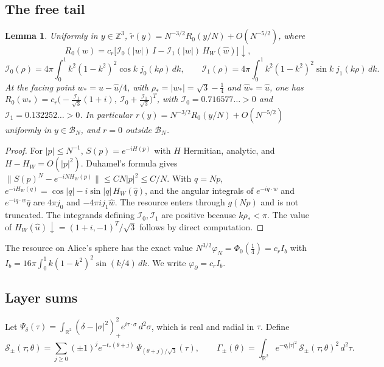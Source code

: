 \documentclass[11pt]{amsart}
\newtheorem{lemma}[theorem]{Lemma}
\theoremstyle{definition}
\theoremstyle{remark}
\newcommand{\Z}{\mathbb{Z}}
\newcommand{\R}{\mathbb{R}}
\newcommand{\cB}{\mathcal{B}}
\newcommand{\cS}{\mathcal{S}}
\newcommand{\dn}{{\downarrow}}
\newcommand{\uhat}{\hat u}
\begin{document}
\subsection{The free tail}
\begin{lemma}\label{lem:tail}
Uniformly in $y\in\Z^3$,
$\widetilde r(y)=N^{-3/2}R_0(y/N)+O(N^{-5/2})$, where
\[
R_0(w)=c_r\bigl[\mathcal I_0(|w|)\,I-\mathcal I_1(|w|)\,H_W(\hat w)\bigr]\dn,
\]
\[
\mathcal I_0(\rho)=4\pi\int_0^1k^2(1-k^2)^2\cos k\;j_0(k\rho)\,dk,\qquad
\mathcal I_1(\rho)=4\pi\int_0^1k^2(1-k^2)^2\sin k\;j_1(k\rho)\,dk .
\]
At the facing point $w_*=u-\uhat/4$, with $\rho_*=|w_*|=\sqrt3-\frac14$ and
$\hat w_*=\uhat$, one has
$R_0(w_*)=c_r\bigl(-\tfrac{\mathcal I_1}{\sqrt3}(1+i),\ \mathcal I_0+\tfrac{\mathcal I_1}{\sqrt3}\bigr)^T$,
with $\mathcal I_0=0.716577\ldots>0$ and $\mathcal I_1=0.132252\ldots>0$.
In particular $r(y)=N^{-3/2}R_0(y/N)+O(N^{-5/2})$ uniformly in $y\in\cB_N$,
and $r=0$ outside $\cB_N$.
\end{lemma}

\begin{proof}
For $|p|\le N^{-1}$, $S(p)=e^{-iH(p)}$ with $H$ Hermitian, analytic, and
$H-H_W=O(|p|^2)$.  Duhamel's formula gives
$\|S(p)^N-e^{-iNH_W(p)}\|\le CN|p|^2\le C/N$.  With $q=Np$,
$e^{-iH_W(q)}=\cos|q|-i\sin|q|\,H_W(\hat q)$, and the angular integrals of
$e^{-iq\cdot w}$ and $e^{-iq\cdot w}\hat q$ are $4\pi j_0$ and
$-4\pi ij_1\hat w$.  The resource enters through $g(Np)$ and is not
truncated.  The integrands defining $\mathcal I_0,\mathcal I_1$ are positive
because $k\rho_*<\pi$.  The value of $H_W(\uhat)\dn=(1+i,-1)^T/\sqrt3$ follows
by direct computation.
\end{proof}

The resource on Alice's sphere has the exact value
$N^{3/2}\varphi_N=\Phi_0(\frac14)=c_rI_b$ with
$I_b=16\pi\int_0^1k(1-k^2)^2\sin(k/4)\,dk$.  We write
$\varphi_\partial=c_rI_b$.

\subsection{Layer sums}
Let $\Psi_\delta(\tau)=\int_{\R^2}(\delta-|\sigma|^2)_+^2e^{i\tau\cdot\sigma}\,d^2\sigma$,
which is real and radial in $\tau$.  Define
\[
\cS_\pm(\tau;\theta)=\sum_{j\ge0}(\pm1)^je^{-t_*(\theta+j)}\,\Psi_{(\theta+j)/\sqrt3}(\tau),
\qquad
\Gamma_\pm(\theta)=\int_{\R^2}e^{-q_t|\tau|^2}\,\cS_\pm(\tau;\theta)^2\,d^2\tau .
\]
\end{document}
